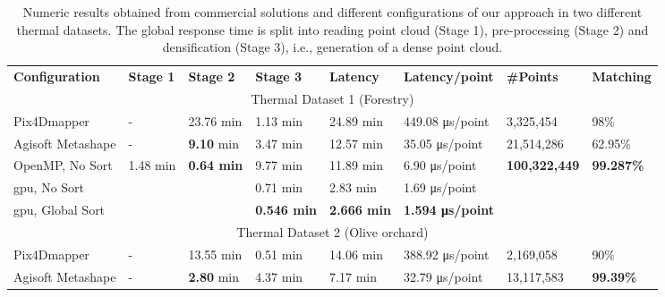 \renewcommand{\arraystretch}{1.3}
\begin{table}
    \centering
    \footnotesize
    \caption{Numeric results obtained from commercial solutions and different configurations of our approach in two different thermal datasets. The global response time is split into reading point cloud (Stage 1), pre-processing (Stage 2) and densification (Stage 3), i.e., generation of a dense point cloud. }
    \label{table:thermal_results}
    \begin{tabular}{l@{\hskip 0.06in}|lll|l|l|l|l}
    \toprule
    \textbf{Configuration} & \textbf{Stage 1} & \textbf{Stage 2} & \textbf{Stage 3} & \textbf{Latency} & \textbf{Latency/point} & \textbf{\#Points} & \textbf{Matching}\\
    \cmidrule{1-8}
    \multicolumn{8}{c}{Thermal Dataset 1 (Forestry)}\\
    \cmidrule{1-8}
    Pix4Dmapper & - & 23.76 \si{\minute} & 1.13 \si{\minute} & 24.89 \si{\minute} & 449.08 \si{\micro\second}/point & 3,325,454 & 98\%\\
    Agisoft Metashape & - & \textbf{9.10} \si{\minute} & 3.47 \si{\minute} & 12.57 \si{\minute} & 35.05 \si{\micro\second}/point & 21,514,286 & 62.95\%\\
    \cmidrule{1-8}
    OpenMP, No Sort & \multirow{\numExperiments}{*}{1.48 \si{\minute}} & \multirow{\numExperiments}{*}{\textbf{0.64 \si{\minute}}} & 9.77 \si{\minute} & 11.89 \si{\minute} & 6.90 \si{\micro\second}/point & \multirow{\numExperiments}{*}{\textbf{100,322,449}} & \multirow{\numExperiments}{*}{\textbf{99.287\%}}\\
    \acrshort{gpu}, No Sort & & & 0.71 \si{\minute} & 2.83 \si{\minute} & 1.69 \si{\micro\second}/point & &\\
    \acrshort{gpu}, Global Sort & & & \textbf{0.546 \si{\minute}} & \textbf{2.666 \si{\minute}} & \textbf{1.594 \si{\micro\second}/point} & &\\
    \bottomrule
    \toprule
    \multicolumn{8}{c}{Thermal Dataset 2 (Olive orchard)}\\
    \cmidrule{1-8}
    Pix4Dmapper & - & 13.55 \si{\minute} & 0.51 \si{\minute} & 14.06 \si{\minute} & 388.92 \si{\micro\second}/point & 2,169,058 & 90\%\\
    Agisoft Metashape & - & \textbf{2.80} \si{\minute} & 4.37 \si{\minute} & 7.17 \si{\minute} & 32.79 \si{\micro\second}/point & 13,117,583 & \textbf{99.39\%}\\

\end{tabular}
\end{table}
